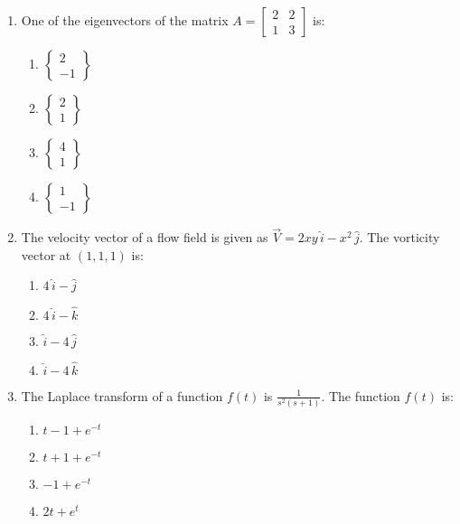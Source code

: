 \documentclass[journal,9pt,onecolumn]{IEEEtran}
\begin{document}
\begin{enumerate}


\item One of the eigenvectors of the matrix $A = \begin{bmatrix} 2 & 2 \\ 1 & 3 \end{bmatrix}$ is:

\begin{multicols}{4}    
\begin{enumerate}
    \item $ \left\{\begin{array}{c}2 \\ -1 \end{array}\right\}$
    \item $ \left\{\begin{array}{c}2 \\ 1 \end{array}\right\}$
    \item $ \left\{\begin{array}{c}4 \\ 1 \end{array}\right\}$
    \item $ \left\{\begin{array}{c}1 \\ -1 \end{array}\right\}$
\end{enumerate}
\end{multicols}

\item The velocity vector of a flow field is given as $ \vec{V} = 2xy \, \hat{i} - x^2 \, \hat{j} $. The vorticity vector at $(1, 1, 1)$ is:
\begin{multicols}{4}
\begin{enumerate}
    \item $ 4 \, \hat{i} - \hat{j} $
    \item $ 4 \, \hat{i} - \hat{k} $
    \item $ \hat{i} - 4 \, \hat{j} $
    \item $ \hat{i} - 4 \, \hat{k} $
\end{enumerate}
\end{multicols}


\item  The Laplace transform of a function $f(t)$ is $\frac{1}{s^2(s+1)}$. The function $f(t)$ is:
\begin{multicols}{4}    
\begin{enumerate}
    \item $ t-1 + e^{-t} $
    \item $ t +1+ e^{-t} $
    \item $ -1 + e^{-t} $
    \item $ 2t + e^{t} $
\end{enumerate}
\end{multicols}



\end{enumerate}
\end{document}
